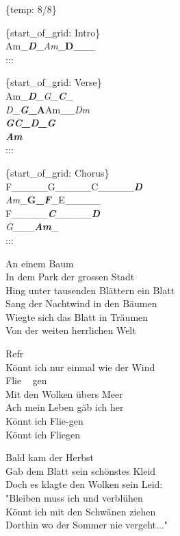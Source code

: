 \documentclass[
  letterpaper,
]{scrbook}
\begin{document}
\{temp: 8/8\}

\{start\_of\_grid: Intro\}\\
Am\_\textbf{\emph{\textbar D}}\_\emph{\textbar Am}\_\textbf{\textbar D}\_\_\_\textbar{}\\
:::

\{start\_of\_grid: Verse\}\\
Am\_\textbf{\emph{\textbar D}}\_\emph{\textbar G}\_\textbf{\emph{\textbar C}}\_\emph{\textbar{}\\
D}\_\textbf{\emph{\textbar G}\_A}\textbar Am\_\emph{\textbf{\textbar{}}\_Dm}\textbar{}\\
\emph{\textbf{G}\textbar{}\textbf{\emph{C\textbf{\textbar{}}\_D\textbf{\textbar{}}\_G\textbf{\textbar{}\\
Am\textbar{}}}}}\textbar{}\\
:::

\{start\_of\_grid: Chorus\}\\
F\_\_\_\_\_\textbar G\_\_\_\_\_\textbar C\_\_\_\_\_\textbar{}\emph{\textbf{D}\textbar{}\\
Am}\_\textbf{\textbar G\_\emph{F\textbf{\textbar{}}}}\_\textbar E\_\_\_\_\_\textbar{}\\
F\_\_\_\_\_\textbar{}\emph{\textbf{C}\textbar{}}\_\_\_\_\_\textbar{}\emph{\textbf{D}\textbar{}\\
G}\_\textbf{\emph{\textbar{}}}\_\textbf{\textbar{}}\_\textbf{\emph{\textbar Am}}\_\textbar{}\\
:::

An einem Baum\\
In dem Park der grossen Stadt\\
Hing unter tausenden Blättern ein Blatt\\
Sang der Nachtwind in den Bäumen\\
Wiegte sich das Blatt in Träumen\\
Von der weiten herrlichen Welt

Refr\\
Könnt ich nur einmal wie der Wind\\
Flie ~ gen\\
Mit den Wolken übers Meer\\
Ach mein Leben gäb ich her\\
Könnt ich Flie-gen\\
Könnt ich Fliegen

Bald kam der Herbst\\
Gab dem Blatt sein schönstes Kleid\\
Doch es klagte den Wolken sein Leid:\\
"Bleiben muss ich und verblühen\\
Könnt ich mit den Schwänen ziehen\\
Dorthin wo der Sommer nie vergeht..."
\end{document}
